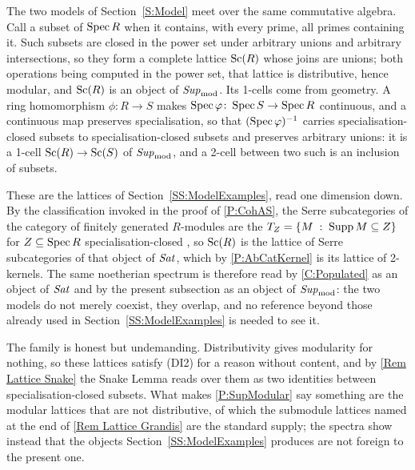 \begin{remark}
  \label{Rem Lattice Spectra}
  The two models of Section~\ref{S:Model} meet over the same commutative algebra. Call a subset of \(\operatorname{Spec} R\)  when it contains, with every prime, all primes containing it. Such subsets are closed in the power set under arbitrary unions and arbitrary intersections, so they form a complete lattice \(\mathrm{Sc}(R)\) whose joins are unions; both operations being computed in the power set, that lattice is distributive, hence modular, and \(\mathrm{Sc}(R)\) is an object of \(\mathit{Sup}_{\mathrm{mod}}\). Its 1-cells come from geometry. A ring homomorphism \(\phi\colon R\to S\) makes \(\operatorname{Spec}\varphi\colon\operatorname{Spec} S\to\operatorname{Spec} R\) continuous, and a continuous map preserves specialisation, so that \((\operatorname{Spec}\varphi)^{-1}\) carries specialisation-closed subsets to specialisation-closed subsets and preserves arbitrary unions: it is a 1-cell \(\mathrm{Sc}(R)\to\mathrm{Sc}(S)\) of \(\mathit{Sup}_{\mathrm{mod}}\), and a 2-cell between two such is an inclusion of subsets.

	These are the lattices of Section~\ref{SS:ModelExamples}, read one dimension down. By the classification invoked in the proof of \prox\ref{P:CohAS}, the Serre subcategories of the category of finitely generated \(R\)-modules are the \(T_{Z}=\{M\;:\;\operatorname{Supp} M\subseteq Z\}\) for \(Z\subseteq\operatorname{Spec} R\) specialisation-closed \cite[Proposition~VI.2.4]{Gabriel62}, so \(\mathrm{Sc}(R)\) is the lattice of Serre subcategories of that object of \(\mathit{Sat}\), which by \prox\ref{P:AbCatKernel} is its lattice of 2-kernels. The same noetherian spectrum is therefore read by \corx\ref{C:Populated} as an object of \(\mathit{Sat}\) and by the present subsection as an object of \(\mathit{Sup}_{\mathrm{mod}}\): the two models do not merely coexist, they overlap, and no reference beyond those already used in Section~\ref{SS:ModelExamples} is needed to see it.

	The family is honest but undemanding. Distributivity gives modularity for nothing, so these lattices satisfy \textup{(DI2)} for a reason without content, and by \remx\ref{Rem Lattice Snake} the Snake Lemma reads over them as two identities between specialisation-closed subsets. What makes \prox\ref{P:SupModular} say something are the modular lattices that are not distributive, of which the submodule lattices named at the end of \remx\ref{Rem Lattice Grandis} are the standard supply; the spectra show instead that the objects Section~\ref{SS:ModelExamples} produces are not foreign to the present one.
\end{remark}

